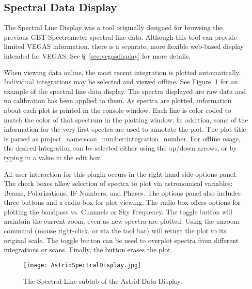 \vspace{-5mm}

\subsection{Spectral Data Display}\label{sec:spectral_data_display}

The Spectral Line Display was a tool originally designed for browsing the previous
\gls{GBT} Spectrometer spectral line data.  Although this tool can provide limited
\gls{VEGAS} information, there is a separate, more flexible web-based display intended
for \gls{VEGAS}. See \S~\ref{sec:vegasdisplay} for more details.

When viewing data online, the most recent integration is plotted automatically.
Individual integrations may be selected and viewed offline. See
Figure~\ref{fig:astridspectralline} for an example of the spectral line data display.
The spectra displayed are raw data and no calibration has been applied to them.
As spectra are plotted, information about each plot is printed in the console window.
Each line is color coded to match the color of that spectrum in the plotting window. In
addition, some of the information for the very first spectra are used to annotate the
plot. The plot title is parsed as project\_name:scan\_number:integration\_number.
For offline usage, the desired integration can be selected either using the up/down arrows,
or by typing in a value in the edit box.

All user interaction for this plugin occurs in the right-hand side options panel. The
check boxes allow selection of spectra to plot via astronomical variables: Beams,
Polarizations, \gls{IF} Numbers, and Phases.
The options panel also includes three buttons and a radio box for plot viewing. The
 radio box offers options for plotting the bandpass vs. Channels or Sky
Frequency. The  toggle button will maintain the current zoom, even
as new spectra are plotted. Using the unzoom command (mouse right-click, or via the
tool bar) will return the plot to its original scale. The  toggle
button can be used to overplot spectra from different integrations or scans.
Finally, the  button erases the plot.

\newpage

\begin{figure}[!h]
\begin{center}
\texttt{[image: AstridSpectralDisplay.jpg]}
\caption[The Spectral Line subtab of the Astrid Data Display]
{The Spectral Line subtab of the \gls{Astrid} Data Display. 
\label{fig:astridspectralline} }
\end{center}
\end{figure}


